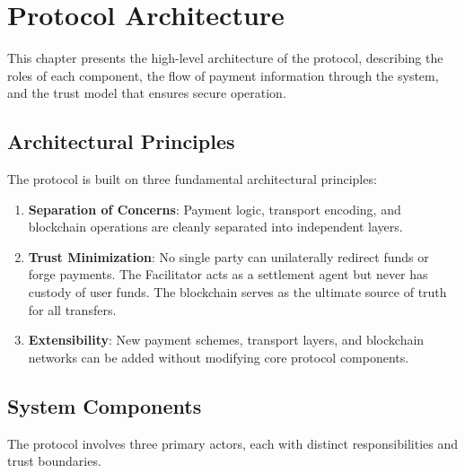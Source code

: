 \chapter{Protocol Architecture}
\label{ch:architecture}

This chapter presents the high-level architecture of the \tprotocol{} protocol, describing the roles of each component, the flow of payment information through the system, and the trust model that ensures secure operation.

\section{Architectural Principles}
\label{sec:arch-principles}

The \tprotocol{} protocol is built on three fundamental architectural principles:

\begin{enumerate}
    \item \textbf{Separation of Concerns}: Payment logic, transport encoding, and blockchain operations are cleanly separated into independent layers.

    \item \textbf{Trust Minimization}: No single party can unilaterally redirect funds or forge payments. The Facilitator acts as a settlement agent but never has custody of user funds. The blockchain serves as the ultimate source of truth for all transfers.

    \item \textbf{Extensibility}: New payment schemes, transport layers, and blockchain networks can be added without modifying core protocol components.
\end{enumerate}

\section{System Components}
\label{sec:components}

The \tprotocol{} protocol involves three primary actors, each with distinct responsibilities and trust boundaries.

